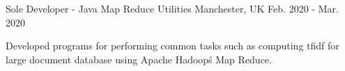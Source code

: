 \begin{cventries}
  

  \cventry
    {Sole Developer - Java} %
    {Map Reduce Utilities} %
    {Manchester, UK} %
    {Feb. 2020 - Mar. 2020} %
    {
      \begin{cvitems} %
        \item {Developed programs for performing common tasks such as computing tfidf for large document database using Apache Hadoop\'s Map Reduce.}
      \end{cvitems}
    }
  



\end{cventries}

